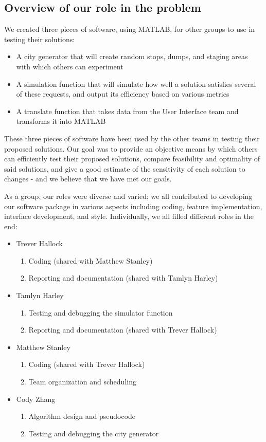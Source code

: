 \documentclass{article}
\begin{document}
\subsection{Overview of our role in the problem}

We created three pieces of software, using MATLAB, for other groups to use in testing their solutions:

\begin{itemize}
\item A city generator that will create random stops, dumps, and staging areas with which others can experiment
\item A simulation function that will simulate how well a solution satisfies several of these requests, and output its efficiency based on various metrics
\item A translate function that takes data from the User Interface team and transforms it into MATLAB
\end{itemize}

These three pieces of software have been used by the other teams in testing their proposed solutions. 
Our goal was to provide an objective means by which others can efficiently test their proposed solutions, compare feasibility and optimality of said solutions, and give a good estimate of the sensitivity of each solution to changes - and we believe that we have met our goals.


As a group, our roles were diverse and varied; we all contributed to developing our software package in various aspects including coding, feature implementation, interface development, and style.  Individually, we all filled different roles in the end:

\begin{itemize}
	\item Trever Hallock
	\begin{enumerate}
		\item Coding (shared with Matthew Stanley)
		\item Reporting and documentation (shared with Tamlyn Harley)
	\end{enumerate}
	\item Tamlyn Harley
	\begin{enumerate}
		\item Testing and debugging the simulator function
		\item Reporting and documentation (shared with Trever Hallock)
	\end{enumerate}
	\item Matthew Stanley
	\begin{enumerate}
		\item Coding (shared with Trever Hallock)
		\item Team organization and scheduling
	\end{enumerate}
	\item Cody Zhang
	\begin{enumerate}
		\item Algorithm design and pseudocode
		\item Testing and debugging the city generator
	\end{enumerate}
\end{itemize}
\end{document}
